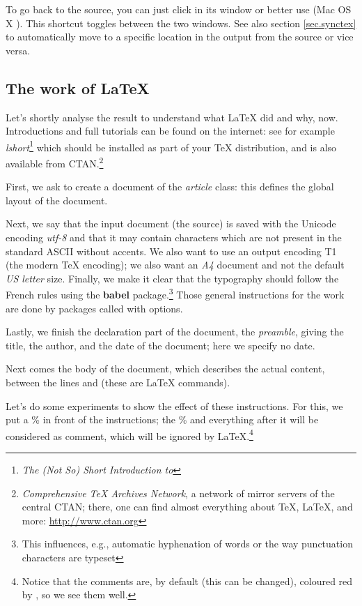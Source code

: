 To go back to the source, you can just click in its window or better use  (Mac OS X ). This shortcut toggles between the two windows. See also section \ref{sec.synctex} to automatically move to a specific location in the output from the source or vice versa.

\subsection{The work of \LaTeX}

Let's shortly analyse the result to understand what \LaTeX{} did and why, now. Introductions and full tutorials can be found on the internet: see for example \emph{lshort}\footnote{\emph{The (Not So) Short Introduction to \LaTeXe}} which should be installed as part of your {\TeX} distribution, and is also available from CTAN.\footnote{\emph{Comprehensive TeX Archives Network}, a network of mirror servers of the central CTAN; there, one can find almost everything about {\TeX}, {\LaTeX}, and more: \url{http://www.ctan.org}}

First, we ask to create a document of the \emph{article} class: this defines the global layout of the document.

Next, we say that the input document (the source) is saved with the Unicode encoding \emph{utf-8} and that it may contain characters which are not present in the standard ASCII without accents. We also want to use an output encoding T1 (the modern {\TeX} encoding); we also want an \emph{A4} document and not the default \emph{US letter} size. Finally, we make it clear that the typography should follow the French rules using the \textbf{\textsf{babel}} package.\footnote{This influences, e.g., automatic hyphenation of words or the way punctuation characters are typeset} Those general instructions for the work are done by packages called with options.

Lastly, we finish the declaration part of the document, the \emph{preamble}, giving the title, the author, and the date of the document; here we specify no date.

Next comes the body of the document, which describes the actual content, between the lines \verb++ and \verb++ (these are {\LaTeX} commands).

Let's do some experiments to show the effect of these instructions. For this, we put a \% in front of the instructions; the \% and everything after it will be considered as comment, which will be ignored by {\LaTeX}.\footnote{Notice that the comments are, by default (this can be changed), coloured red by {\Tw}, so we see them well.}

